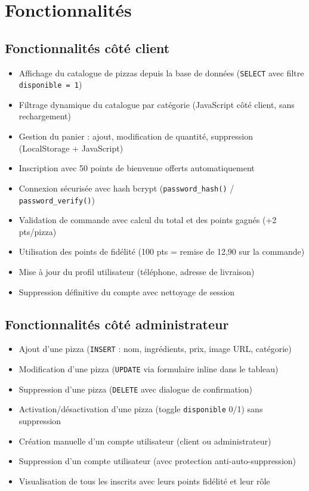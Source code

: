 \documentclass[a4paper,12pt]{article}
\begin{document}
\section{Fonctionnalités}

\subsection{Fonctionnalités côté client}

\begin{itemize}
    \item Affichage du catalogue de pizzas depuis la base de données (\texttt{SELECT} avec filtre \texttt{disponible = 1})
    \item Filtrage dynamique du catalogue par catégorie (JavaScript côté client, sans rechargement)
    \item Gestion du panier : ajout, modification de quantité, suppression (LocalStorage + JavaScript)
    \item Inscription avec 50 points de bienvenue offerts automatiquement
    \item Connexion sécurisée avec hash bcrypt (\texttt{password\_hash()} / \texttt{password\_verify()})
    \item Validation de commande avec calcul du total et des points gagnés (+2 pts/pizza)
    \item Utilisation des points de fidélité (100 pts = remise de 12,90\texteuro{} sur la commande)
    \item Mise à jour du profil utilisateur (téléphone, adresse de livraison)
    \item Suppression définitive du compte avec nettoyage de session
\end{itemize}

\subsection{Fonctionnalités côté administrateur}

\begin{itemize}
    \item Ajout d'une pizza (\texttt{INSERT} : nom, ingrédients, prix, image URL, catégorie)
    \item Modification d'une pizza (\texttt{UPDATE} via formulaire inline dans le tableau)
    \item Suppression d'une pizza (\texttt{DELETE} avec dialogue de confirmation)
    \item Activation/désactivation d'une pizza (toggle \texttt{disponible} 0/1) sans suppression
    \item Création manuelle d'un compte utilisateur (client ou administrateur)
    \item Suppression d'un compte utilisateur (avec protection anti-auto-suppression)
    \item Visualisation de tous les inscrits avec leurs points fidélité et leur rôle
\end{itemize}
\end{document}
